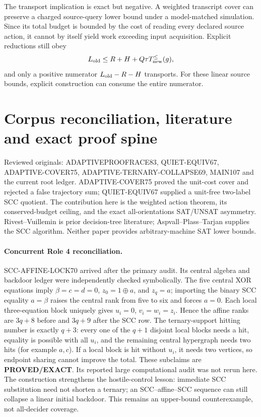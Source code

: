 \documentclass[11pt]{article}
\begin{document}
The transport implication is exact but negative.  A weighted transcript cover
can preserve a charged source-query lower bound under a model-matched
simulation.  Since its total budget is bounded by the cost of reading every
declared source action, it cannot by itself yield work exceeding input
acquisition.  Explicit reductions still obey
\[
L_{\rm old}\le R+H+Q\tau T_{\rm new}^{\le}(g),
\]
and only a positive numerator $L_{\rm old}-R-H$ transports.  For these linear
source bounds, explicit construction can consume the entire numerator.

\section{Corpus reconciliation, literature and exact proof spine}
Reviewed originals: ADAPTIVEPROOFRACE83, QUIET-EQUIV67,
ADAPTIVE-COVER75, ADAPTIVE-TERNARY-COLLAPSE69, MAIN107 and the current root
ledger.  ADAPTIVE-COVER75 proved the unit-cost cover and rejected a false
trajectory sum; QUIET-EQUIV67 supplied a unit-free two-label SCC quotient.
The contribution here is the weighted action theorem, its conserved-budget
ceiling, and the exact all-orientations SAT/UNSAT asymmetry.  Rivest--Vuillemin
is prior decision-tree literature; Aspvall--Plass--Tarjan supplies the SCC
algorithm.  Neither paper provides arbitrary-machine SAT lower bounds.

\paragraph{Concurrent Role 4 reconciliation.}
SCC-AFFINE-LOCK70 arrived after the primary audit.  Its central algebra and
backdoor ledger were independently checked symbolically.  The five central
XOR equations imply
$\beta=c=d=0$, $z_0=1\oplus a$, and $z_q=a$; importing the binary SCC equality
$a=\beta$ raises the central rank from five to six and forces $a=0$.
Each local three-equation block uniquely gives
$u_i=0$, $v_i=w_i=z_i$.  Hence the affine ranks are $3q+8$ before and
$3q+9$ after the SCC row.  The ternary-support hitting number is exactly
$q+3$: every one of the $q+1$ disjoint local blocks needs a hit, equality is
possible with all $u_i$, and the remaining central hypergraph needs two hits
(for example $a,c$).  If a local block is hit without $u_i$, it needs two
vertices, so endpoint sharing cannot improve the total.  These subclaims are
\textbf{PROVED/EXACT}.  Its reported large computational audit was not rerun
here.  The construction strengthens the hostile-control lesson: immediate
SCC substitution need not shorten a ternary; an SCC--affine--SCC sequence can
still collapse a linear initial backdoor.  This remains an upper-bound
counterexample, not all-decider coverage.
\end{document}
